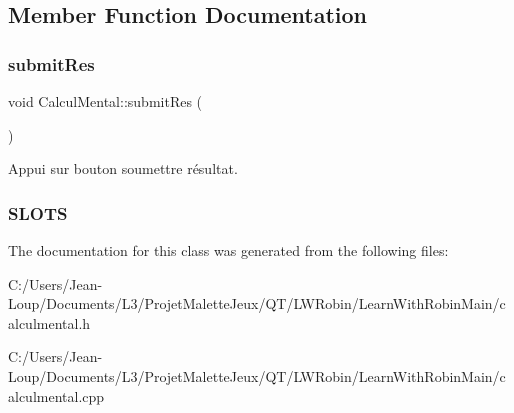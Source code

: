 \subsection{Member Function Documentation}
\mbox{\label{class_calcul_mental_ae74ebe9d8a7f8581ab2958a7987b7d5d}} 
\subsubsection{\texorpdfstring{submit\+Res}{submitRes}}
{\footnotesize\ttfamily void Calcul\+Mental\+::submit\+Res (\begin{DoxyParamCaption}{ }\end{DoxyParamCaption})\hspace{0.3cm}{\ttfamily [slot]}}



Appui sur bouton soumettre résultat. 



 \subsubsection*{S\+L\+O\+TS }

The documentation for this class was generated from the following files\+:\begin{DoxyCompactItemize}
\item 
C\+:/\+Users/\+Jean-\/\+Loup/\+Documents/\+L3/\+Projet\+Malette\+Jeux/\+Q\+T/\+L\+W\+Robin/\+Learn\+With\+Robin\+Main/calculmental.\+h\item 
C\+:/\+Users/\+Jean-\/\+Loup/\+Documents/\+L3/\+Projet\+Malette\+Jeux/\+Q\+T/\+L\+W\+Robin/\+Learn\+With\+Robin\+Main/calculmental.\+cpp\end{DoxyCompactItemize}
